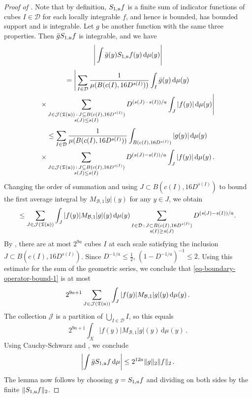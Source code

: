 \begin{proof}[Proof of ]
    \leanok
    Note that by definition, $S_{1,{\mathfrak u}}f$ is a finite sum of indicator functions of cubes $I \in \mathcal{D}$ for each locally integrable $f$, and hence is bounded, has bounded support and is integrable. Let $g$ be another function with the same three properties. Then $\bar g S_{1,{\mathfrak u}}f$ is integrable, and we have
    $$
        \Bigg|\int \bar g(y) S_{1,{\mathfrak u}}f(y) \, \mathrm{d}\mu(y)\Bigg|
    $$
    \begin{multline*}
        = \Bigg|\sum_{I\in\mathcal{D}} \frac{1}{\mu(B(c(I), 16 D^{s(I)}))} \int_I \bar g(y) \, \mathrm{d}\mu(y)\\
        \times \sum_{\substack{J\in \mathcal{J}({\mathfrak T}({\mathfrak u}))\,:\,J\subseteq B(c(I), 16 D^{s(I)})\\s(J)\le s(I)}} D^{(s(J)-s(I))/a}\int_J |f(y)| \,\mathrm{d}\mu(y)\Bigg|
    \end{multline*}
    \begin{multline*}
        \le \sum_{I\in\mathcal{D}} \frac{1}{\mu(B(c(I), 16D^{s(I)}))} \int_{B(c(I), 16D^{s(I)})} | g(y)| \, \mathrm{d}\mu(y)\\ \times \sum_{\substack{J\in \mathcal{J}({\mathfrak T}({\mathfrak u}))\,:\,J\subseteq B(c(I), 16 D^{s(I)})\\ s(J) \le s(I)}} D^{(s(J)-s(I))/a}\int_J |f(y)| \,\mathrm{d}\mu(y)\,.
    \end{multline*}
    Changing the order of summation and using $J \subset B(c(I), 16 D^{s(I)})$ to bound the first average integral by $M_{\mathcal{B},1}|g|(y)$ for any $y \in J$, we obtain
    \begin{align}
    \label{eq-boundary-operator-bound-1}
        \le \sum_{J\in\mathcal{J}({\mathfrak T}({\mathfrak u}))}\int_J|f(y)| M_{\mathcal{B},1}|g|(y) \, \mathrm{d}\mu(y) \sum_{\substack{I \in \mathcal{D} \, : \, J\subset B(c(I),16 D^{s(I)})\\ s(I) \ge s(J)}} D^{(s(J)-s(I))/a}.
    \end{align}
    By , there are at most $2^{9a}$ cubes $I$ at each scale satisfying the inclusion $J \subset B(c(I),16D^{s(I)})$.
    Since $D^{-1/a}\le\frac12$, $(1 - D^{-1/a})^{-1} \le 2$.
    Using this estimate for the sum of the geometric series, we conclude that \eqref{eq-boundary-operator-bound-1} is at most
    $$
        2^{9a+1} \sum_{J\in\mathcal{J}({\mathfrak T}({\mathfrak u}))}\int_J|f(y)| M_{\mathcal{B},1}|g|(y) \, \mathrm{d}\mu(y)\,.
    $$
    The collection $\mathcal{J}$ is a partition of $\bigcup_{I \in \mathcal{D}} I$, so this equals
    $$
        2^{9a+1} \int_X|f(y)| M_{\mathcal{B},1}|g|(y) \, \mathrm{d}\mu(y)\,.
    $$
    Using Cauchy-Schwarz and , we conclude
    $$
        \left|\int \bar g S_{1,{\mathfrak u}}f \, \mathrm{d}\mu \right| \le 2^{12a} \|g\|_2\|f\|_2\,.
    $$
    The lemma now follows by choosing $g = S_{1,{\mathfrak u}}f$ and dividing on both sides by the finite $\|S_{1,{\mathfrak u}}f\|_2$.
\end{proof}

